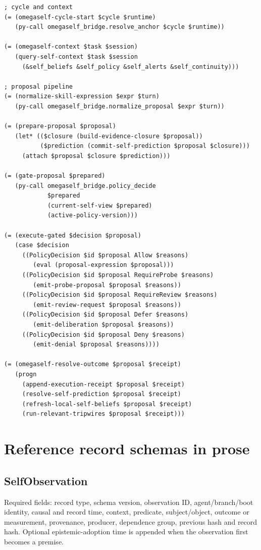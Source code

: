 \documentclass[11pt,oneside]{report}
\begin{document}
\begin{lstlisting}[language=Metta,caption={Public OmegaSelf API sketch}]
; cycle and context
(= (omegaself-cycle-start $cycle $runtime)
   (py-call omegaself_bridge.resolve_anchor $cycle $runtime))

(= (omegaself-context $task $session)
   (query-self-context $task $session
     (&self_beliefs &self_policy &self_alerts &self_continuity)))

; proposal pipeline
(= (normalize-skill-expression $expr $turn)
   (py-call omegaself_bridge.normalize_proposal $expr $turn))

(= (prepare-proposal $proposal)
   (let* (($closure (build-evidence-closure $proposal))
          ($prediction (commit-self-prediction $proposal $closure)))
     (attach $proposal $closure $prediction)))

(= (gate-proposal $prepared)
   (py-call omegaself_bridge.policy_decide
            $prepared
            (current-self-view $prepared)
            (active-policy-version)))

(= (execute-gated $decision $proposal)
   (case $decision
     ((PolicyDecision $id $proposal Allow $reasons)
        (eval (proposal-expression $proposal)))
     ((PolicyDecision $id $proposal RequireProbe $reasons)
        (emit-probe-proposal $proposal $reasons))
     ((PolicyDecision $id $proposal RequireReview $reasons)
        (emit-review-request $proposal $reasons))
     ((PolicyDecision $id $proposal Defer $reasons)
        (emit-deliberation $proposal $reasons))
     ((PolicyDecision $id $proposal Deny $reasons)
        (emit-denial $proposal $reasons))))

(= (omegaself-resolve-outcome $proposal $receipt)
   (progn
     (append-execution-receipt $proposal $receipt)
     (resolve-self-prediction $proposal $receipt)
     (refresh-local-self-beliefs $proposal $receipt)
     (run-relevant-tripwires $proposal $receipt)))
\end{lstlisting}

\chapter{Reference record schemas in prose}

\section{SelfObservation}
Required fields: record type, schema version, observation ID, agent/branch/boot identity, causal and record time, context, predicate, subject/object, outcome or measurement, provenance, producer, dependence group, previous hash and record hash. Optional epistemic-adoption time is appended when the observation first becomes a premise.
\end{document}
